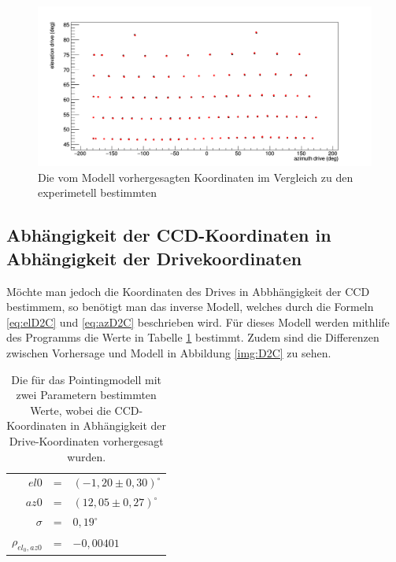 \begin{figure}[htbp]
\centering
\includegraphics[width=\textwidth]{../341/C2Dcomp2.png}
\caption{Die vom Modell vorhergesagten Koordinaten im Vergleich zu den experimetell bestimmten}
\label{img:C2Dcomp2}
\end{figure}

\subsection{Abhängigkeit der CCD-Koordinaten in Abhängigkeit der Drivekoordinaten}
Möchte man jedoch die Koordinaten des Drives in Abbhängigkeit der CCD bestimmem, so benötigt man das inverse Modell, welches durch die Formeln \ref{eq:elD2C} und \ref{eq:azD2C} beschrieben wird. Für dieses Modell werden mithlife des Programms die Werte in Tabelle \ref{tab:D2C} bestimmt. Zudem sind die Differenzen zwischen Vorhersage und Modell in Abbildung  \ref{img:D2C} zu sehen.
\begin{table}[htbp]
\centering
\begin{tabular}{rcl}
\toprule
$el0$ &=& $(-1,20\pm0,30)^{\circ}$\\
$az0$ &=& $(12,05\pm0,27)^{\circ}$\\
$\sigma$ &=& $0,19^{\circ}$\\
$\rho_{el_0,az0}$ &=& $-0,00401$\\
\bottomrule
\end{tabular}
\label{tab:D2C}
\caption{Die für das Pointingmodell mit zwei Parametern bestimmten Werte, wobei die CCD-Koordinaten in Abhängigkeit der Drive-Koordinaten vorhergesagt wurden.}
\end{table}

